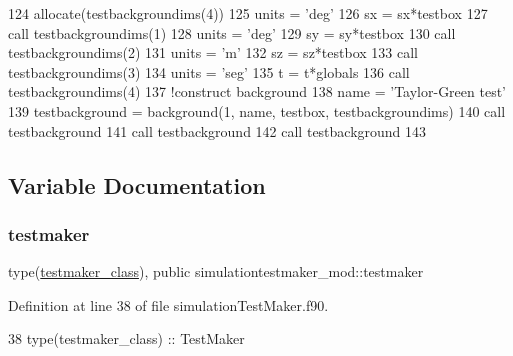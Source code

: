 \begin{DoxyCode}
124     \textcolor{keyword}{allocate}(testbackgroundims(4))
125     units = \textcolor{stringliteral}{'deg'}
126     sx = sx*testbox%
127     \textcolor{keyword}{call }testbackgroundims(1)%
128     units = \textcolor{stringliteral}{'deg'}
129     sy = sy*testbox%
130     \textcolor{keyword}{call }testbackgroundims(2)%
131     units = \textcolor{stringliteral}{'m'}
132     sz = sz*testbox%
133     \textcolor{keyword}{call }testbackgroundims(3)%
134     units = \textcolor{stringliteral}{'seg'}
135     t = t*globals%
136     \textcolor{keyword}{call }testbackgroundims(4)%
137     \textcolor{comment}{!construct background}
138     name = \textcolor{stringliteral}{'Taylor-Green test'}
139     testbackground = background(1, name, testbox, testbackgroundims)
140     \textcolor{keyword}{call }testbackground%
141     \textcolor{keyword}{call }testbackground%
142     \textcolor{keyword}{call }testbackground%
143 
\end{DoxyCode}


\subsection{Variable Documentation}
\mbox{\label{namespacesimulationtestmaker__mod_a344a43a231fc0e61e77875fa7ec95b12}} 
\subsubsection{\texorpdfstring{testmaker}{testmaker}}
{\footnotesize\ttfamily type(\mbox{\hyperlink{structsimulationtestmaker__mod_1_1testmaker__class}{testmaker\+\_\+class}}), public simulationtestmaker\+\_\+mod\+::testmaker}



Definition at line 38 of file simulation\+Test\+Maker.\+f90.


\begin{DoxyCode}
38     \textcolor{keywordtype}{type}(testmaker\_class) :: TestMaker
\end{DoxyCode}
